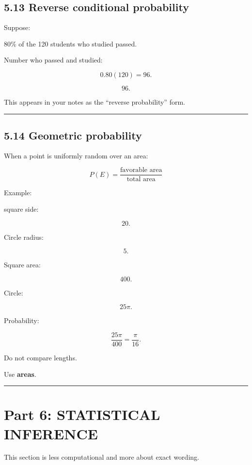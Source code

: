\documentclass[
]{article}
\begin{document}
\subsection{5.13 Reverse conditional
probability}\label{reverse-conditional-probability}

Suppose:

80\% of the 120 students who studied passed.

Number who passed and studied:

\[
0.80(120)=96.
\]

\[
\boxed{96}.
\]

This appears in your notes as the ``reverse probability'' form.

\begin{center}\rule{0.5\linewidth}{0.5pt}\end{center}

\subsection{5.14 Geometric probability}\label{geometric-probability}

When a point is uniformly random over an area:

\[
\boxed{
P(E)
=
\frac{\text{favorable area}}
{\text{total area}}
}
\]

Example:

square side:

\[
20.
\]

Circle radius:

\[
5.
\]

Square area:

\[
400.
\]

Circle:

\[
25\pi.
\]

Probability:

\[
\frac{25\pi}{400}
=
\boxed{\frac{\pi}{16}}.
\]

Do not compare lengths.

Use \textbf{areas}.

\begin{center}\rule{0.5\linewidth}{0.5pt}\end{center}

\section{Part 6: STATISTICAL
INFERENCE}\label{part-6-statistical-inference}

This section is less computational and more about exact wording.
\end{document}
